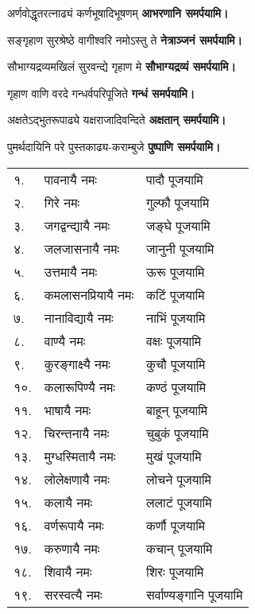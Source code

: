 \begin{center}
{अर्णवोद्धृतरत्नाढ्यं कर्णभूषादिभूषणम्}
\textbf{\devAya{} आभरणानि समर्पयामि।}
\medskip


{सङ्गृहाण सुरश्रेष्ठे वागीश्वरि नमोऽस्तु ते}
\textbf{\devAya{} नेत्राञ्जनं समर्पयामि।}
\footnotemark[\value{footnote}]
\medskip

{सौभाग्यद्रव्यमखिलं सुरवन्द्ये गृहाण मे}
\textbf{\devAya{} सौभाग्यद्रव्यं समर्पयामि।}
\medskip

{गृहाण वाणि वरदे गन्धर्वपरिपूजिते}
\textbf{\devAya{} गन्धं समर्पयामि।}
\medskip

{अक्षतेऽद्भुतरूपाढ्ये यक्षराजादिवन्दिते}
\textbf{\devAya{} अक्षतान् समर्पयामि।}
\medskip

{पुमर्थदायिनि परे पुस्तकाढ्य-कराम्बुजे}
\textbf{\devAya{} पुष्पाणि समर्पयामि।}
\end{center}


\begin{longtable}{ll@{— }l}
 १. & पावनायै नमः & पादौ पूजयामि\\
 २. & गिरे नमः & गुल्फौ पूजयामि\\
 ३. & जगद्वन्द्यायै नमः &  जङ्घे पूजयामि\\
 ४. & जलजासनायै नमः & जानुनी पूजयामि\\
 ५. & उत्तमायै नमः & ऊरू  पूजयामि\\
 ६. & कमलासनप्रियायै नमः & कटिं पूजयामि\\
 ७. & नानाविद्यायै नमः & नाभिं पूजयामि\\
 ८. & वाण्यै नमः & वक्षः पूजयामि\\
 ९. & कुरङ्गाक्ष्यै नमः & कुचौ पूजयामि\\
१०. & कलारूपिण्यै नमः &  कण्ठं पूजयामि\\
११. & भाषायै नमः & बाहून् पूजयामि\\
१२. & चिरन्तनायै नमः & चुबुकं पूजयामि\\
१३. & मुग्धस्मितायै नमः & मुखं पूजयामि\\
१४. & लोलेक्षणायै नमः & लोचने पूजयामि\\
१५. & कलायै नमः & ललाटं पूजयामि\\
१६. & वर्णरूपायै नमः & कर्णौ पूजयामि\\
१७. & करुणायै नमः & कचान् पूजयामि\\
१८. & शिवायै नमः & शिरः पूजयामि\\
१९. & सरस्वत्यै नमः &  सर्वाण्यङ्गानि पूजयामि\\
\end{longtable}

